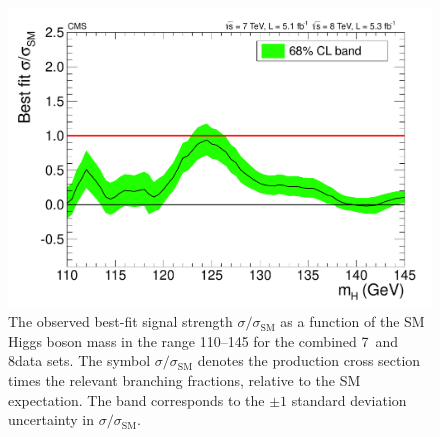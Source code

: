 \documentclass[11pt,twoside,a4paper,cmspaper,final]{cms-tdr}
\begin{document}
\begin{figure} [htbp]
\begin{center}
\includegraphics[width=\cmsFigWideWidth]{rect_mlz_comb_HPA_smallGGScale_1}
\caption{The observed best-fit signal strength $\sigma/\sigma_\mathrm{SM}$
as a function of the SM Higgs boson mass in the range 110--145\GeV
for the combined 7~and 8\TeV data sets.
The symbol $\sigma/\sigma_\mathrm{SM}$ denotes the
      production cross section times the relevant branching fractions,
relative to the SM expectation. The band corresponds to the $\pm 1$ standard deviation uncertainty
in $\sigma/\sigma_\mathrm{SM}$.
    }
\label{fig:muhat}
\end{center}
\end{figure}
\end{document}
